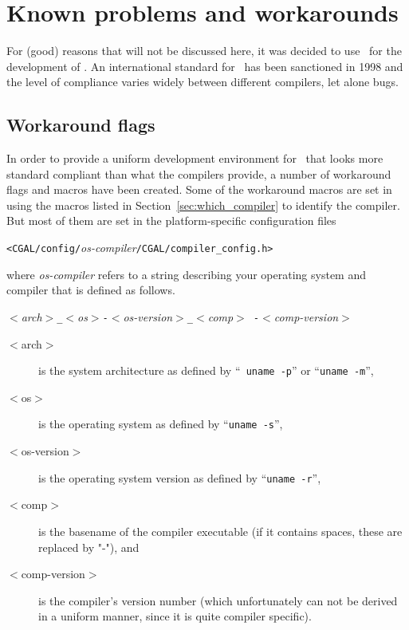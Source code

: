 \section{Known problems and workarounds}
\label{sec:problems_and_workarounds}

For (good) reasons that will not be discussed here, it was decided to
use \CC\ for the development of \cgal. An international standard for
\CC\ has been sanctioned in 1998 \cite{cgal:ansi-is14882-98} and the
level of compliance varies widely between different
compilers, let alone bugs.

\subsection{Workaround flags}
\label{sec:workaround_flags}

In order to provide a uniform development environment for \cgal\ that
looks more standard compliant than what the compilers provide, a number
of workaround flags and macros have been created.  Some of the
workaround macros are set in 
using the macros 
listed in Section~\ref{sec:which_compiler} to identify the compiler. 
But most of them are set in the platform-specific configuration files
\begin{center}
\texttt{<CGAL/config/}{\em os-compiler}\texttt{/CGAL/compiler\_config.h>}
\end{center}
where \textit{os-compiler} refers to a string describing your
operating system and compiler that is defined as follows.

\begin{center}
  \textit{$<$arch$>$\texttt{\_}$<$os$>$\texttt{-}$<$os-version$>$\texttt{\_}$<$comp$>${\tt
      -}$<$comp-version$>$}
\end{center}

\begin{description}
\item[$<$arch$>$] is the system architecture as defined by ``{\tt
    uname -p}'' or ``\texttt{uname -m}'',
\item[$<$os$>$] is the operating system as defined by ``\texttt{uname
    -s}'',
\item[$<$os-version$>$] is the operating system version as defined by
  ``\texttt{uname -r}'',
\item[$<$comp$>$] is the basename of the compiler executable (if it
  contains spaces, these are replaced by "-"), and
\item[$<$comp-version$>$] is the compiler's version number (which
  unfortunately can not be derived in a uniform manner, since it is
  quite compiler specific).
\end{description}

